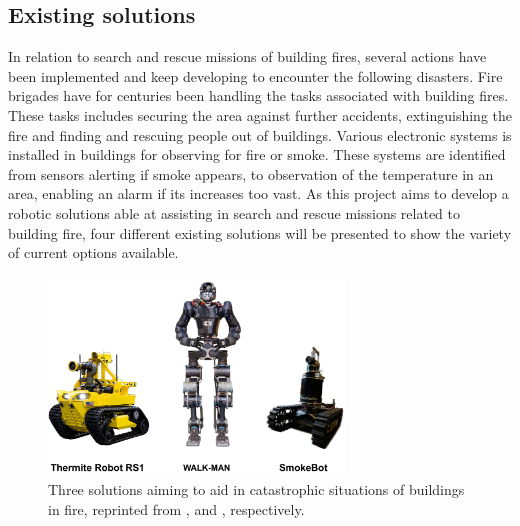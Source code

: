 \subsection{Existing solutions}\label{subsec:ExistingSolutions}
In relation to search and rescue missions of building fires, several actions have been implemented and keep developing to encounter the following disasters. Fire brigades have for centuries been handling the tasks associated with building fires. These tasks includes securing the area against further accidents, extinguishing the fire and finding and rescuing people out of buildings. Various electronic systems is installed in buildings for observing for fire or smoke. These systems are identified from sensors alerting if smoke appears, to observation of the temperature in an area, enabling an alarm if its increases too vast. As this project aims to develop a robotic solutions able at assisting in search and rescue missions related to building fire, four different existing solutions will be presented to show the variety of current options available.  

\begin{figure}[H]
    \centering
    \includegraphics[width=0.7\textwidth]{figures/1Problem_analysis/Existing solutions.pdf}
    \caption{Three solutions aiming to aid in catastrophic situations of buildings in fire, reprinted from \cite{SearchAndRescue:Thermite_RS1}, \cite{SearchAndRescue:WALKMAN} and \cite{SearchAndRescue:SmokeBot}, respectively.}
    \label{fig:Existing_Solutions}
\end{figure}

